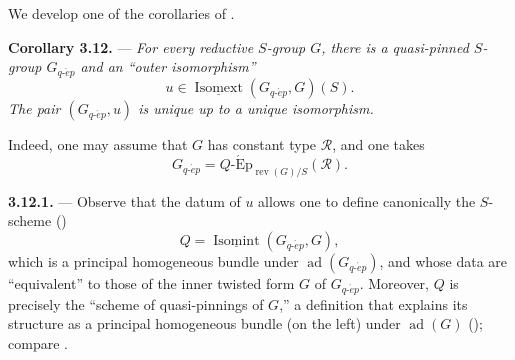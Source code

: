 We develop one of the corollaries of .

\medskip\noindent\textbf{Corollary 3.12.} ---
{\itshape For every reductive \(S\)-group \(G\), there is a quasi-pinned
\(S\)-group \(G_{q\text{-}\acute{e}p}\) and an ``outer isomorphism''}
\[
  u\in
  \underline{\operatorname{Isomext}}
    (G_{q\text{-}\acute{e}p},G)(S).
\]
{\itshape The pair \((G_{q\text{-}\acute{e}p},u)\) is unique up to a
unique isomorphism.}

Indeed, one may assume that \(G\) has constant type \(\mathscr R\),
and one takes
\[
  G_{q\text{-}\acute{e}p}
  =
  Q\text{-}\operatorname{\acute{E}p}_{\operatorname{rev}(G)/S}
    (\mathscr R).
\]

\medskip\noindent\textbf{3.12.1.} ---
Observe that the datum of \(u\) allows one to define canonically the \(S\)-scheme
()
\[
  Q=
  \underline{\operatorname{Isomint}}
    (G_{q\text{-}\acute{e}p},G),
\]
which is a principal homogeneous bundle under
\(\operatorname{ad}(G_{q\text{-}\acute{e}p})\), and whose data are
``equivalent'' to those of the inner twisted form \(G\) of
\(G_{q\text{-}\acute{e}p}\). Moreover, \(Q\) is precisely the
``scheme of quasi-pinnings of \(G\),'' a definition that explains its
structure as a principal homogeneous bundle (on the left) under
\(\operatorname{ad}(G)\) (); compare .
